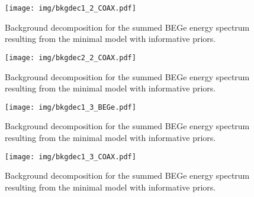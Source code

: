 \begin{landscape}
\begin{figure}
	\end{figure}
	\begin{figure}
		\centering
		\texttt{[image: img/bkgdec1\_2\_COAX.pdf]}
		\caption{Background decomposition for the summed BEGe energy spectrum resulting from the minimal model with informative priors.}
	\end{figure}
	\begin{figure}
		\centering
		\texttt{[image: img/bkgdec2\_2\_COAX.pdf]}
		\caption{Background decomposition for the summed BEGe energy spectrum resulting from the minimal model with informative priors.}
	\end{figure}
	\begin{figure}
		\centering
		\texttt{[image: img/bkgdec1\_3\_BEGe.pdf]}
		\caption{Background decomposition for the summed BEGe energy spectrum resulting from the minimal model with informative priors.}
	\end{figure}
	\begin{figure}
		\centering
		\texttt{[image: img/bkgdec1\_3\_COAX.pdf]}
		\caption{Background decomposition for the summed BEGe energy spectrum resulting from the minimal model with informative priors.}
	\end{figure}
\end{landscape}
\restoregeometry
